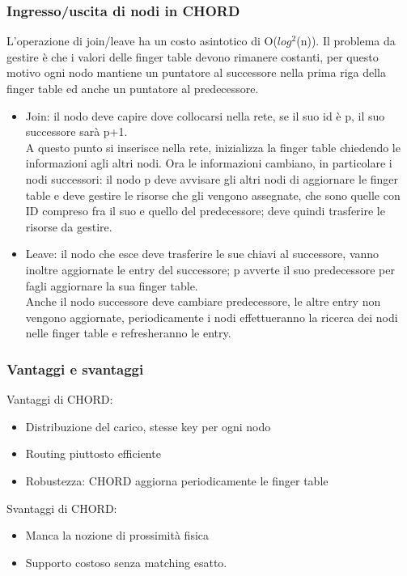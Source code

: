 \documentclass[16px]{article}
\begin{document}
\subsubsection{Ingresso/uscita di nodi in CHORD}
L'operazione di join/leave ha un costo asintotico di O($log^2$(n)). Il problema da gestire è che i valori delle finger table devono rimanere costanti, per questo motivo ogni nodo mantiene un puntatore al successore nella prima riga della finger table ed anche un puntatore al predecessore.
\begin{itemize}
\item Join: il nodo deve capire dove collocarsi nella rete, se il suo id è p, il suo successore sarà p+1.\\ A questo punto si inserisce nella rete, inizializza la finger table chiedendo le informazioni agli altri nodi. Ora le informazioni cambiano, in particolare i nodi successori: il nodo p deve avvisare gli altri nodi di aggiornare le finger table e deve gestire le risorse che gli vengono assegnate, che sono quelle con ID compreso fra il suo e quello del predecessore; deve quindi trasferire le risorse da gestire.
\item Leave: il nodo che esce deve trasferire le sue chiavi al successore, vanno inoltre aggiornate le entry del successore; p avverte il suo predecessore per fagli aggiornare la sua finger table.\\ Anche il nodo successore deve cambiare predecessore, le altre entry non vengono aggiornate, periodicamente i nodi effettueranno la ricerca dei nodi nelle finger table e refresheranno le entry.
\end{itemize}
\subsubsection{Vantaggi e svantaggi}
Vantaggi di CHORD:
\begin{itemize}
\item Distribuzione del carico, stesse key per ogni nodo
\item Routing piuttosto efficiente
\item Robustezza: CHORD aggiorna periodicamente le finger table
\end{itemize}
Svantaggi di CHORD:
\begin{itemize}
\item Manca la nozione di prossimità fisica
\item Supporto costoso senza matching esatto.
\end{itemize}
\end{document}
